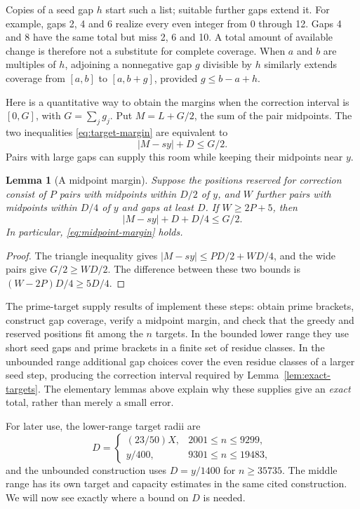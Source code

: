 \documentclass[11pt]{article}
\newtheorem{lemma}[theorem]{Lemma}
\theoremstyle{definition}
\begin{document}
Copies of a seed gap \(h\) start such a list; suitable further gaps extend it.
For example, gaps 2, 4 and 6 realize every even integer from 0 through 12.
Gaps 4 and 8 have the same total but miss 2, 6 and 10. A total amount of
available change is therefore not a substitute for complete coverage.
When \(a\) and \(b\) are multiples of \(h\), adjoining a nonnegative gap
\(g\) divisible by \(h\) similarly extends coverage from \([a,b]\) to
\([a,b+g]\), provided \(g\le b-a+h\).

Here is a quantitative way to obtain the margins when the correction interval
is \([0,G]\), with \(G=\sum_jg_j\). Put \(M=L+G/2\), the sum of the pair
midpoints. The two inequalities \eqref{eq:target-margin} are equivalent to
\begin{equation}\label{eq:midpoint-margin}
 |M-sy|+D\le G/2.
\end{equation}
Pairs with large gaps can supply this room while keeping their midpoints near
\(y\).

\begin{lemma}[A midpoint margin]\label{lem:margin}
Suppose the positions reserved for correction consist of \(P\) pairs with midpoints within
\(D/2\) of \(y\), and \(W\) further pairs with midpoints within \(D/4\) of
\(y\) and gaps at least \(D\). If \(W\ge2P+5\), then
\[
 |M-sy|+D+D/4\le G/2.
\]
In particular, \eqref{eq:midpoint-margin} holds.
\end{lemma}
\begin{proof}
The triangle inequality gives \(|M-sy|\le PD/2+WD/4\), and the wide pairs give
\(G/2\ge WD/2\). The difference between these two bounds is
\((W-2P)D/4\ge5D/4\).
\end{proof}

The prime-target supply results of \cite[Section 3.2 and the range constructions
in Section 4]{Companion} implement these steps: obtain prime brackets, construct
gap coverage, verify a midpoint margin, and check that the greedy and reserved
positions fit among the \(n\) targets. In the bounded lower range they use
short seed gaps and prime brackets in a finite set of residue classes. In the
unbounded range additional gap choices cover the even residue classes of a
larger seed step, producing the correction interval required by
Lemma~\ref{lem:exact-targets}. The elementary lemmas above explain why these
supplies give an \emph{exact} total, rather than merely a small error.

For later use, the lower-range target radii are
\begin{equation}\label{eq:radii}
 D=\begin{cases}
 (23/50)X,&2001\le n\le9299,\\
 y/400,&9301\le n\le19483,
 \end{cases}
\end{equation}
and the unbounded construction uses \(D=y/1400\) for \(n\ge35735\).
The middle range has its own target and capacity estimates in the same cited
construction. We will now see exactly where a bound on \(D\) is needed.
\end{document}
